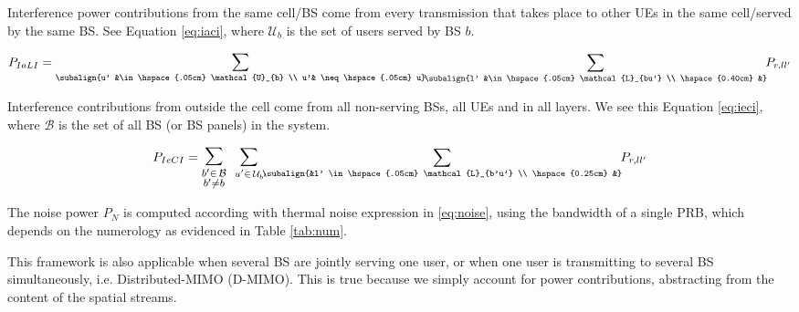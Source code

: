 
Interference power contributions from the same cell/BS come from every transmission that takes place to other UEs in the same cell/served by the same BS. See Equation \eqref{eq:iaci}, where $\mathcal{U}_{b}$ is the set of users served by BS $b$.

\begin{equation} \label{eq:iaci}
    P_{IaLI} = \mathlarger{\sum}_{\subalign{u' &\in \hspace{.05cm} \mathcal{U}_{b} \\ u'& \neq \hspace{.05cm} u}} \hspace{-0.1cm} \sum_{\subalign{l' &\in \hspace{.05cm} \mathcal{L}_{bu'} \\ \hspace{0.40cm} &}} \hspace{-0.1cm} P_{r, ll'} 
\end{equation}

Interference contributions from outside the cell come from all non-serving BSs, all UEs and in all layers. We see this Equation \eqref{eq:ieci}, where $\mathcal{B}$ is the set of all BS (or BS panels) in the system.

\begin{equation} \label{eq:ieci}
    P_{IeCI} = \mathlarger{\mathlarger{\sum}}_{\substack{b' \in \hspace{.05cm} \mathcal{B} \\ b' \neq b}} \ \mathlarger{\sum}_{\ u' \in \hspace{.05cm} \mathcal{U}_{b'}} \hspace{-0.2cm} \sum_{\subalign{&l' \in \hspace{.05cm} \mathcal{L}_{b'u'} \\ \hspace{0.25cm} &}} \hspace{-0.1cm} P_{r, ll'} 
\end{equation}

The noise power $P_N$ is computed according with thermal noise expression in \ref{eq:noise}, using the bandwidth of a single PRB, which depends on the numerology as evidenced in Table \ref{tab:num}.

This framework is also applicable when several BS are jointly serving one user, or when one user is transmitting to several BS simultaneously, i.e. Distributed-MIMO (D-MIMO). This is true because we simply account for power contributions, abstracting from the content of the spatial streams.


